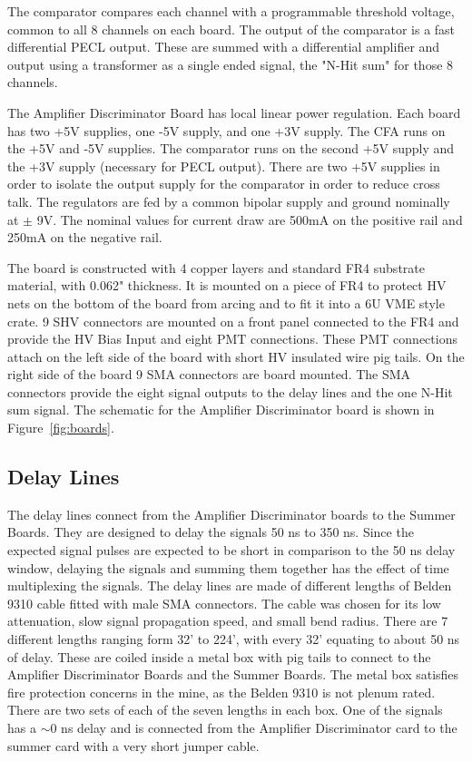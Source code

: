 \documentclass{JINST}
\begin{document}
The comparator compares each channel with a programmable threshold
voltage, common to all 8 channels on each board.  The output of the
comparator is a fast differential PECL output.  These are summed with
a differential amplifier and output using a transformer as a single
ended signal, the "N-Hit sum" for those 8 channels.

The Amplifier Discriminator Board has local linear power regulation.
Each board has two +5V supplies, one -5V supply, and one +3V supply.
The CFA runs on the +5V and -5V supplies.  The comparator runs on the
second +5V supply and the +3V supply (necessary for PECL output).
There are two +5V supplies in order to isolate the output supply for
the comparator in order to reduce cross talk.  The regulators are fed
by a common bipolar supply and ground nominally at $\pm$ 9V.  The
nominal values for current draw are 500mA on the positive rail and
250mA on the negative rail.

The board is constructed with 4 copper layers and standard FR4
substrate material, with 0.062" thickness.  It is mounted on a piece
of FR4 to protect HV nets on the bottom of the board from arcing and
to fit it into a 6U VME style crate.  9 SHV connectors are mounted on
a front panel connected to the FR4 and provide the HV Bias Input and
eight PMT connections.  These PMT connections attach on the left side
of the board with short HV insulated wire pig tails.  On the right
side of the board 9 SMA connectors are board mounted.  The SMA
connectors provide the eight signal outputs to the delay lines and the
one N-Hit sum signal.  The schematic for the Amplifier Discriminator board is shown in Figure~\ref{fig:boards}.

\subsection{Delay Lines}
\label{sec:Delay}
%
The delay lines connect from the Amplifier Discriminator boards to the
Summer Boards.  They are designed to delay the signals 50 ns to 350
ns.  Since the expected signal pulses are expected to be short in
comparison to the 50 ns delay window, delaying the signals and summing
them together has the effect of time multiplexing the signals.  The
delay lines are made of different lengths of Belden 9310 cable fitted
with male SMA connectors.  The cable was chosen for its low
attenuation, slow signal propagation speed, and small bend radius.
There are 7 different lengths ranging form 32' to 224', with every 32'
equating to about 50 ns of delay.  These are coiled inside a metal box
with pig tails to connect to the Amplifier Discriminator Boards and
the Summer Boards.  The metal box satisfies fire protection concerns
in the mine, as the Belden 9310 is not plenum rated.  There are two
sets of each of the seven lengths in each box.  One of the signals has
a $\sim$0 ns delay and is connected from the Amplifier Discriminator card to
the summer card with a very short jumper cable.
\end{document}
